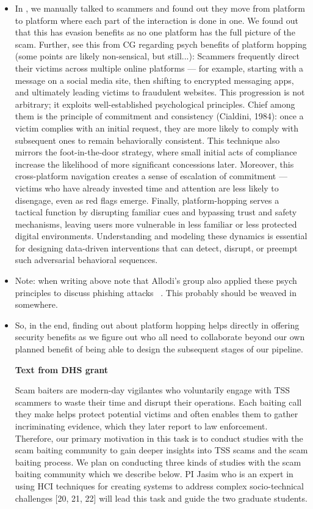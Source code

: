 \begin{itemize}
\item In \cite{honeytweets}, we manually talked to scammers and found out they move from platform to platform where each part of the interaction is done in one. We found out that this has evasion benefits as no one platform has the full picture of the scam. Further, see this from CG regarding psych benefits of platform hopping (some points are likely non-sensical, but still...):
Scammers frequently direct their victims across multiple online platforms — for example, starting with a message on a social media site, then shifting to encrypted messaging apps, and ultimately leading victims to fraudulent websites. This progression is not arbitrary; it exploits well-established psychological principles. Chief among them is the principle of commitment and consistency (Cialdini, 1984): once a victim complies with an initial request, they are more likely to comply with subsequent ones to remain behaviorally consistent. This technique also mirrors the foot-in-the-door strategy, where small initial acts of compliance increase the likelihood of more significant concessions later. Moreover, this cross-platform navigation creates a sense of escalation of commitment — victims who have already invested time and attention are less likely to disengage, even as red flags emerge. Finally, platform-hopping serves a tactical function by disrupting familiar cues and bypassing trust and safety mechanisms, leaving users more vulnerable in less familiar or less protected digital environments. Understanding and modeling these dynamics is essential for designing data-driven interventions that can detect, disrupt, or preempt such adversarial behavioral sequences.

\item Note: when writing above note that Allodi's group also applied these psych principles to discuss phishing attacks ~\cite{HeijdenA19}. This probably should be weaved in somewhere.

\item So, in the end, finding out about platform hopping helps directly in offering security benefits as we figure out who all need to collaborate beyond our own planned benefit of being able to design the subsequent stages of our pipeline. 


\textbf{Text from DHS grant}

Scam baiters are modern-day vigilantes who voluntarily engage with TSS
scammers to waste their time and disrupt their operations. Each baiting call they make helps protect
potential victims and often enables them to gather incriminating evidence, which they later report to law
enforcement. Therefore, our primary motivation in this task is to conduct studies with the scam baiting
community to gain deeper insights into TSS scams and the scam baiting process. We plan on conducting
three kinds of studies with the scam baiting community which we describe below. PI Jasim who is an
expert in using HCI techniques for creating systems to address complex socio-technical challenges [20,
21, 22] will lead this task and guide the two graduate students.



\end{itemize}
